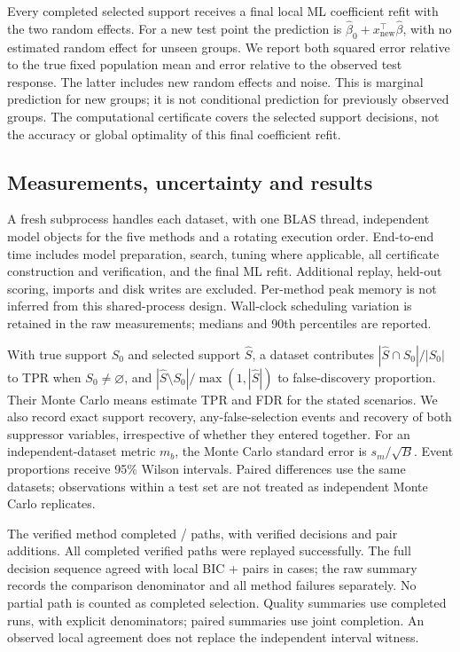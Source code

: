 \documentclass[11pt,a4paper]{article}
\theoremstyle{remark}\newtheorem{remark}[theorem]{Remark}
\begin{document}
Every completed selected support receives a final local ML coefficient refit
with the two random effects. For a new test point the prediction is
$\widehat\beta_0+x_{\mathrm{new}}^\top\widehat\beta$, with no estimated random
effect for unseen groups. We report both squared error relative to the true
fixed population mean and error relative to the observed test response.
The latter includes new random effects and noise. This is marginal prediction
for new groups; it is not conditional prediction for previously observed groups.
The computational certificate covers the selected support decisions, not the
accuracy or global optimality of this final coefficient refit.

\subsection{Measurements, uncertainty and results}
A fresh subprocess handles each dataset, with one BLAS thread, independent
model objects for the five methods and a rotating execution order. End-to-end
time includes model preparation, search, tuning where applicable, all certificate
construction and verification, and the final ML refit. Additional replay,
held-out scoring, imports and disk writes are excluded. Per-method peak memory
is not inferred from this shared-process design. Wall-clock scheduling variation
is retained in the raw measurements; medians and 90th percentiles are reported.

With true support $S_0$ and selected support $\widehat S$, a dataset contributes
$|\widehat S\cap S_0|/|S_0|$ to TPR when $S_0\ne\varnothing$, and
$|\widehat S\setminus S_0|/\max(1,|\widehat S|)$ to false-discovery proportion.
Their Monte Carlo means estimate TPR and FDR for the stated scenarios.
We also record exact support recovery, any-false-selection events and recovery
of both suppressor variables, irrespective of whether they entered together.
For an independent-dataset metric $m_b$, the Monte Carlo standard error is
$s_m/\sqrt B$. Event proportions receive 95\% Wilson intervals. Paired
differences use the same datasets; observations within a test set are not
treated as independent Monte Carlo replicates.

The verified method completed \ComparisonComplete{}/\ComparisonCases{} paths,
with \ComparisonSteps{} verified decisions and \ComparisonPairs{} pair additions.
All completed verified paths were replayed successfully. The full decision
sequence agreed with local BIC + pairs in \ComparisonAgreed{} cases; the raw
summary records the comparison denominator and all method failures separately.
No partial path is counted as completed selection. Quality summaries use
completed runs, with explicit denominators; paired summaries use joint completion.
An observed local agreement does not replace the independent interval witness.
\end{document}
